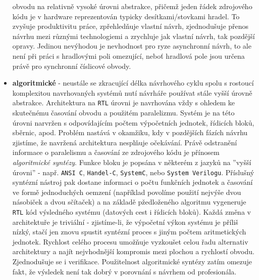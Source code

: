 \begin{itemize}
              obvodu na relativně vysoké úrovni abstrakce, přičemž jeden řádek zdrojového kódu je v 
              hardware reprezentován typicky desítkami/stovkami hradel. To zvyšuje produktivitu 
              práce, zpřehledňuje vlastní návrh, zjednodušuje přenos návrhu mezi různými 
              technologiemi a zrychluje jak vlastní návrh, tak pozdější opravy. Jedinou 
              nevý\-ho\-dou je nevhodnost pro ryze asynchronní návrh, to ale není při práci s     
              hrad\-lo\-vý\-mi poli omezující, neboť hradlová pole jsou určena právě pro synchronní 
              číslicové obvody.
        \item \textbf{algoritmické} - neustále se zkracující délka návrhového cyklu spolu s  
              rostoucí komplexitou navrhovaných systémů nutí návrháře používat stále vyšší úrovně 
              abstrakce. Architektura na \texttt{RTL} úrovni je navrhována vždy s ohledem ke 
              skutečnému časování obvodu a použitém paralelizmu. Systém je na této úrovni narvržen 
              s odpovídajícím počtem výpočetních jednotek, řídicích bloků, sběrnic, apod. Problém 
              nastává v okamžiku, kdy v pozdějších fázích návrhu zjistíme, že navržená architektura 
              nesplňuje očekávání. Právě od\-stra\-ně\-ní informace o paralelismu a časování ze 
              zdrojového kódu je přínosem \emph{algoritmické syntézy}. Funkce bloku je popsána v 
              některém z jazyků na ''vyšší úrovni'' - např. \texttt{ANSI C}, \texttt{Handel-C}, 
              \texttt{SystemC}, nebo \texttt{System Verilogu}. Příslušný syntézní nástroj pak    
              dostane informaci o počtu funkčních jednotek a časování ve formě jednoduchých oemzení 
              (například povolíme použití nejvýše dvou násobiček a dvou sčítaček) a na základě 
              pžedloženého algoritmu vygeneruje \texttt{RTL} kód výsledného systému (datových cest 
              i řídicích bloků). Kaž\-dá změna v architektuře je triviální - zjistíme-li, že 
              výpočetní výkon systému je příliš nízký, stačí jen znovu spustit syntézní proces s 
              jiným počtem aritmetických jednotek. Rychlost celého procesu umožňuje vyzkoušet celou 
              řadu alternativ architektury a najít nejvhodnější kompromis mezi plochou a rychlostí 
              obvodu. Zjednodušuje se i verifikace. Použitelnost algoritmické syntézy zatím omezuje 
              fakt, že výsledek není tak dobrý v porovnání s návrhem od profesionála. 
      \end{itemize}
